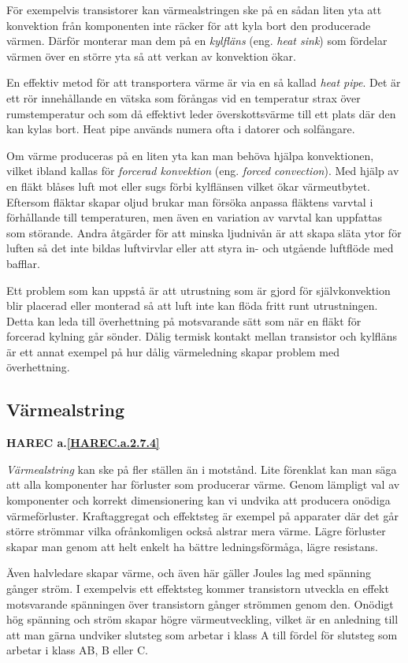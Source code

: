 För exempelvis transistorer kan värmealstringen ske på en sådan liten yta att
konvektion från komponenten inte räcker för att kyla bort den producerade
värmen. Därför monterar man dem på en \emph{kylfläns} (eng.
\emph{heat sink}) som fördelar värmen över en större yta så att verkan av
konvektion ökar.

En effektiv metod för att transportera värme är via en så kallad \emph{heat pipe}.
Det är ett rör innehållande en vätska som förångas vid en temperatur strax över
rumstemperatur och som då effektivt leder överskottsvärme till ett plats där den kan
kylas bort. Heat pipe används numera ofta i datorer och solfångare.

Om värme produceras på en liten yta kan man behöva hjälpa konvektionen, vilket
ibland kallas för \emph{forcerad konvektion} (eng. \emph{forced convection}).
Med hjälp av en fläkt blåses luft mot eller sugs förbi kylflänsen vilket ökar
värmeutbytet. Eftersom fläktar skapar oljud brukar man försöka anpassa
fläktens varvtal i förhållande till temperaturen, men även en variation av
varvtal kan uppfattas som störande. Andra åtgärder för att minska ljudnivån
är att skapa släta ytor för luften så det inte bildas luftvirvlar eller att 
styra in- och utgående luftflöde med bafflar.

Ett problem som kan uppstå är att utrustning som är gjord för självkonvektion
blir placerad eller monterad så att luft inte kan flöda fritt runt
utrustningen. Detta kan leda till överhettning på motsvarande sätt som när
en fläkt för forcerad kylning går sönder. Dålig termisk kontakt mellan
transistor och kylfläns är ett annat exempel på hur dålig värmeledning skapar
problem med överhettning.

\subsection{Värmealstring}
\textbf{
HAREC a.\ref{HAREC.a.2.7.4}\label{myHAREC.a.2.7.4}
}

\emph{Värmealstring} kan ske på fler ställen än i motstånd. Lite förenklat
kan man säga att alla komponenter har förluster som producerar värme. Genom
lämpligt val av komponenter och korrekt dimensionering kan vi undvika att
producera onödiga värmeförluster. Kraftaggregat och effektsteg är exempel
på apparater där det går större strömmar vilka ofrånkomligen också alstrar
mera värme. Lägre förluster skapar man genom att helt enkelt ha bättre
ledningsförmåga, lägre resistans.

Även halvledare skapar värme, och även här gäller Joules lag med spänning
gånger ström. I exempelvis ett effektsteg kommer transistorn utveckla en
effekt motsvarande spänningen över transistorn gånger strömmen genom den. 
Onödigt hög spänning och ström skapar högre värmeutveckling, vilket är en 
anledning till att man gärna undviker slutsteg som arbetar i klass A till fördel för
slutsteg som arbetar i klass AB, B eller C.

